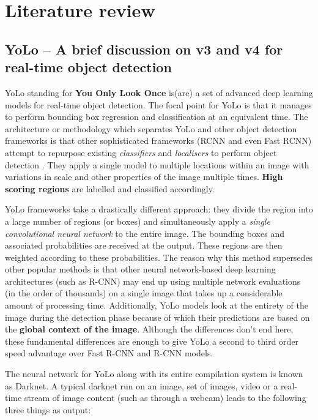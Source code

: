 \chapter{Literature review} \label{chapter2}

\section{YoLo – A brief discussion on v3 and v4 for real-time object detection} \label{brief_discuss}
YoLo standing for \textbf{You Only Look Once} is(are) a set of advanced deep learning models for real-time object detection. The focal point for YoLo is that it manages to perform bounding box regression and classification at an equivalent time. The architecture or methodology which separates YoLo and other object detection frameworks is that other sophisticated frameworks (RCNN and even Fast RCNN) attempt to repurpose existing \textit{classifiers} and \textit{localisers} to perform object detection \cite{Srivastava2021}. They apply a single model to multiple locations within an image with variations in scale and other properties of the image multiple times. \textbf{High scoring regions} are labelled and classified accordingly. \par

YoLo frameworks take a drastically different approach: they divide the region into a large number of regions (or boxes) and simultaneously apply a \textit{single convolutional neural network} to the entire image. The bounding boxes and associated probabilities are received at the output. These regions are then weighted according to these probabilities. The reason why this method supersedes other popular methods is that other neural network-based deep learning architectures (such as R-CNN) may end up using multiple network evaluations (in the order of thousands) on a single image that takes up a considerable amount of processing time. Additionally, YoLo models look at the entirety of the image during the detection phase because of which their predictions are based on the \textbf{global context of the image}. Although the differences don’t end here, these fundamental differences are enough to give YoLo a second to third order speed advantage over Fast R-CNN and R-CNN models. \par

The neural network for YoLo along with its entire compilation system is known as Darknet. A typical darknet run on an image, set of images, video or a real-time stream of image content (such as through a webcam) leads to the following three things as output:

